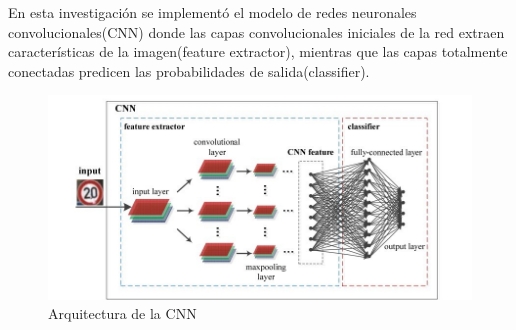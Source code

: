 	En esta investigación se implementó el modelo de redes neuronales convolucionales(CNN) donde las capas convolucionales iniciales de la red extraen características de la imagen(feature extractor), mientras que las capas totalmente conectadas predicen las probabilidades de salida(classifier).

		\begin{figure}[H]
		\includegraphics[width=1\textwidth]{images/desarrollo/networkArquitec/tempGeneralCNNmodel}
		\begin{center}
		\caption{\small{Arquitectura de la CNN}}
		
		{\small{\fontsize{10}{16.8}\selectfont {Extreme Learning Classifier}}}
		\end{center}
		\vspace{-1.5em}
		\end{figure}

